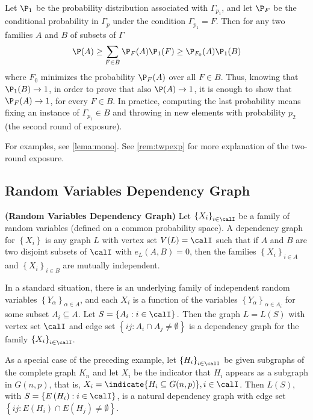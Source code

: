 \documentclass{article}
\newcommand{\bfs}[1]{\textbf{({#1}) }}
\begin{document}
Let $\P _{1}$ be the probability distribution associated with $\Gamma_{p_{1}}$, and let $\P _{F}$ be the conditional probability in $\Gamma_{p}$ under the condition $\Gamma_{p_{1}}=F .$ Then for any two families $A$ and $B$ of subsets of $\Gamma$
\begin{align*}
\P ( A ) \geq \sum_{F \in B } \P _{F}( A ) \P _{1}(F) \geq \P _{F_{0}}( A ) \P _{1}( B )
\end{align*}
where $F_{0}$ minimizes the probability $\P _{F}( A )$ over all $F \in B .$ Thus, knowing that $\P _{1}(B) \rightarrow 1$, in order to prove that also $\P ( A ) \rightarrow 1$, it is enough to show that $\P _{F}( A ) \rightarrow 1$, for every $F \in B .$ In practice, computing the last probability means fixing an instance of $\Gamma_{p_{1}} \in B$ and throwing in new elements  with probability $p_{2}$ (the second round of exposure).

\begin{rema}
For examples, see \cref{lema:mono}. See \cref{rem:twpexp} for more explanation of the two-round exposure.
\end{rema}

\subsection{Random Variables Dependency Graph}
\begin{defa}{\bfs{Random Variables Dependency Graph}}
 Let $\left\{X_{i}\right\}_{i \in \calI}$ be a family of random variables (defined on a common probability space). A dependency graph for $\left\{X_{i}\right\}$ is any graph $L$ with vertex set $V(L)= \calI$ such that if $A$ and $B$ are two disjoint subsets of $\calI$ with $e_{L}(A, B)=0$, then the families $\left\{X_{i}\right\}_{i \in A}$ and $\left\{X_{i}\right\}_{i \in B}$ are mutually independent.
\end{defa}

\begin{exma}
 In a standard situation, there is an underlying family of independent random variables $\left\{Y_{\alpha}\right\}_{\alpha \in A }$, and each $X_{i}$ is a function of the variables $\left\{Y_{\alpha}\right\}_{\alpha \in A_{i}}$ for some subset $A_{i} \subseteq A .$ Let $S=\left\{A_{i}: i \in \calI\right\} .$ Then the graph
$L=L(S)$ with vertex set $\calI$ and edge set $\left\{i j: A_{i} \cap A_{j} \neq \emptyset\right\}$ is a dependency graph for the family $\left\{X_{i}\right\}_{i \in \calI }$.
\end{exma} 
\begin{exma}
As a special case of the preceding example, let $\left\{H_{i}\right\}_{i \in \calI}$ be given subgraphs of the complete graph $K_{n}$ and let $X_{i}$ be the indicator that $H_{i}$ appears as a subgraph in $G (n, p)$, that is, $X_{i}= \indicate{H_{i} \subseteq G (n, p)}, i \in \calI$.
Then $L(S)$, with $S=\left\{E\left(H_{i}\right): i \in \calI \right\}$, is a natural dependency graph with edge set $\left\{i j: E\left(H_{i}\right) \cap E\left(H_{j}\right) \neq \emptyset\right\}$.

\end{exma}
\end{document}
